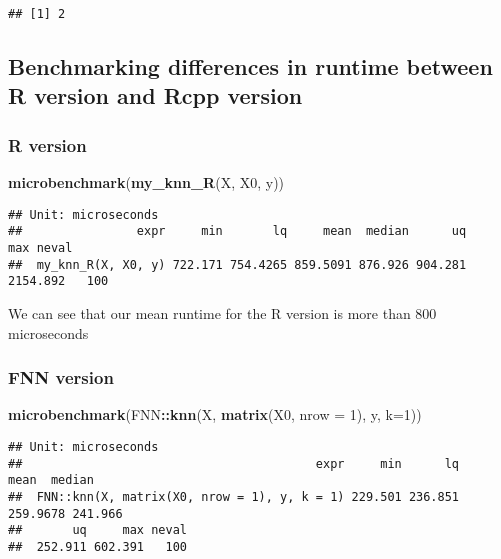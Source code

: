 \documentclass[]{article}
\newenvironment{Shaded}{\begin{snugshade}}{\end{snugshade}}
\newcommand{\DataTypeTok}[1]{\textcolor[rgb]{0.13,0.29,0.53}{#1}}
\newcommand{\DecValTok}[1]{\textcolor[rgb]{0.00,0.00,0.81}{#1}}
\newcommand{\KeywordTok}[1]{\textcolor[rgb]{0.13,0.29,0.53}{\textbf{#1}}}
\newcommand{\NormalTok}[1]{#1}
\newcommand{\OperatorTok}[1]{\textcolor[rgb]{0.81,0.36,0.00}{\textbf{#1}}}
\begin{document}
\begin{verbatim}
## [1] 2
\end{verbatim}

\hypertarget{benchmarking-differences-in-runtime-between-r-version-and-rcpp-version}{%
\subsection{Benchmarking differences in runtime between R version and
Rcpp
version}\label{benchmarking-differences-in-runtime-between-r-version-and-rcpp-version}}

\hypertarget{r-version}{%
\subsubsection{R version}\label{r-version}}

\begin{Shaded}
\begin{Highlighting}[]
\KeywordTok{microbenchmark}\NormalTok{(}\KeywordTok{my_knn_R}\NormalTok{(X, X0, y))}
\end{Highlighting}
\end{Shaded}

\begin{verbatim}
## Unit: microseconds
##                expr     min       lq     mean  median      uq      max neval
##  my_knn_R(X, X0, y) 722.171 754.4265 859.5091 876.926 904.281 2154.892   100
\end{verbatim}

We can see that our mean runtime for the R version is more than 800
microseconds

\hypertarget{fnn-version}{%
\subsubsection{FNN version}\label{fnn-version}}

\begin{Shaded}
\begin{Highlighting}[]
\KeywordTok{microbenchmark}\NormalTok{(FNN}\OperatorTok{::}\KeywordTok{knn}\NormalTok{(X, }\KeywordTok{matrix}\NormalTok{(X0, }\DataTypeTok{nrow =} \DecValTok{1}\NormalTok{), y, }\DataTypeTok{k=}\DecValTok{1}\NormalTok{))}
\end{Highlighting}
\end{Shaded}

\begin{verbatim}
## Unit: microseconds
##                                         expr     min      lq     mean  median
##  FNN::knn(X, matrix(X0, nrow = 1), y, k = 1) 229.501 236.851 259.9678 241.966
##       uq     max neval
##  252.911 602.391   100
\end{verbatim}
\end{document}
